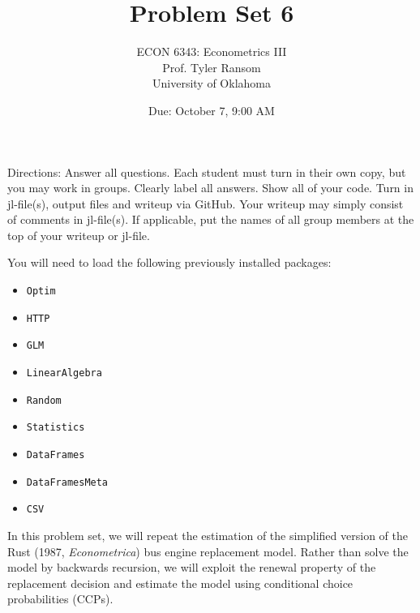 \documentclass[12pt,english]{article}
\begin{document}
\title{Problem Set 6}
\author{ECON 6343: Econometrics III\\
Prof. Tyler Ransom\\
University of Oklahoma}
\date{Due: October 7, 9:00 AM}

\maketitle
Directions: Answer all questions. Each student must turn in their own copy, but you may work in groups. Clearly label all answers. Show all of your code. Turn in jl-file(s), output files and writeup via GitHub. Your writeup may simply consist of comments in jl-file(s). If applicable, put the names of all group members at the top of your writeup or jl-file.


You will need to load the following previously installed packages:
\begin{itemize}
    \item[~] \texttt{Optim} 
    \item[~] \texttt{HTTP} 
    \item[~] \texttt{GLM} 
    \item[~] \texttt{LinearAlgebra} 
    \item[~] \texttt{Random} 
    \item[~] \texttt{Statistics} 
    \item[~] \texttt{DataFrames} 
    \item[~] \texttt{DataFramesMeta} 
    \item[~] \texttt{CSV} 
\end{itemize}
\pagebreak
In this problem set, we will repeat the estimation of the simplified version of the Rust (1987, \textit{Econometrica}) bus engine replacement model. Rather than solve the model by backwards recursion, we will exploit the renewal property of the replacement decision and estimate the model using conditional choice probabilities (CCPs). 
\end{document}
